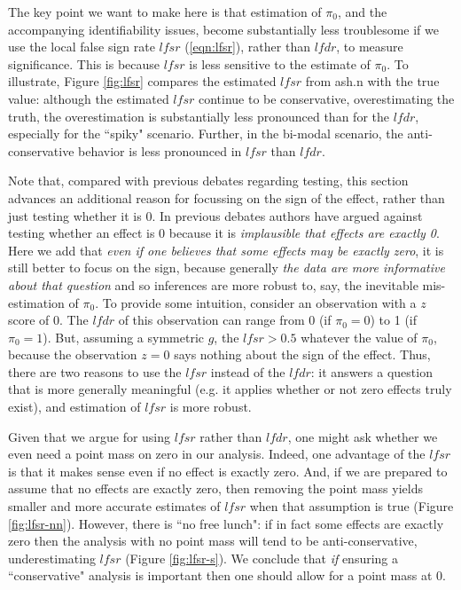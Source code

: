 \documentclass[11pt]{article}
\def\lfdr{\textit{lfdr}}
\def\lfsr{\textit{lfsr}}
\begin{document}
The key point we want to make here is that estimation of $\pi_0$, and the accompanying identifiability issues,
 become substantially less troublesome if we use the local false sign rate $\lfsr$ (\ref{eqn:lfsr}), rather than $\lfdr$, to measure significance. 
 This is because $\lfsr$ is less sensitive to the estimate of $\pi_0$.
To illustrate, Figure \ref{fig:lfsr} compares the estimated $\lfsr$ from ash.n with the true value: although the estimated $\lfsr$ continue to
be conservative, overestimating the truth, the overestimation is substantially less pronounced than for the $\lfdr$, especially for
the ``spiky" scenario. Further, in the bi-modal scenario, the anti-conservative behavior is less pronounced in $\lfsr$ than $\lfdr$.

Note that, compared with previous debates regarding testing, 
this section advances an additional reason for focussing on the sign of the effect, rather than just testing whether it is 0. 
In previous debates authors have argued against testing whether an effect is 0
because it is {\it implausible that effects are exactly 0}. Here we add that {\it even if one believes
that some effects may be exactly zero}, it is still better to focus on the sign, because generally {\it the data are more informative about that question}
and so inferences are more robust to, say, the inevitable mis-estimation of $\pi_0$.
To provide some intuition, consider an observation with a $z$ score of 0. The $\lfdr$ of this observation can range from 0 (if $\pi_0=0$)
to 1 (if $\pi_0=1$). But, assuming a symmetric $g$, the $\lfsr>0.5$ whatever the value of $\pi_0$, because the observation $z=0$ says
nothing about the sign of the effect.
Thus, there are two reasons to use the $\lfsr$ instead of the $\lfdr$: it answers a question that is more generally meaningful (e.g. it applies
whether or not zero effects truly exist),  and estimation of $\lfsr$ is more robust. 
 
Given that we argue for using $\lfsr$ rather than $\lfdr$, one might ask whether we even need a point mass on zero in our analysis.
Indeed, one advantage of the $\lfsr$ is that it makes sense even if no effect is exactly zero. And, 
if we are prepared to assume that no effects are exactly zero, then removing the point mass 
yields smaller and more accurate estimates of $\lfsr$ when that assumption is true (Figure \ref{fig:lfsr-nn}). 
However, there is ``no free lunch":  if in fact some effects are exactly zero
then the analysis with no point mass will tend to be anti-conservative, underestimating $\lfsr$ (Figure \ref{fig:lfsr-s}). 
We conclude that {\it if} ensuring a ``conservative" analysis is important then one should allow for a point mass at 0. 
\end{document}

